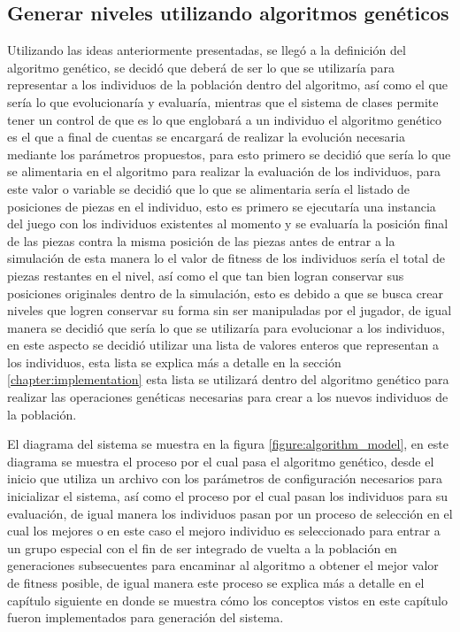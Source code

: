 \subsection{Generar niveles utilizando algoritmos genéticos}
\label{subsection:generate-levels-using-GA}

Utilizando las ideas anteriormente presentadas, se llegó a la definición del
algoritmo genético, se decidó que deberá de ser lo que se utilizaría para
representar a los individuos de la población dentro del algoritmo, así como el
que sería lo que evolucionaría y evaluaría, mientras que el sistema de clases
permite tener un control de que es lo que englobará a un individuo el algoritmo
genético es el que a final de cuentas se encargará de realizar la evolución
necesaria mediante los parámetros propuestos, para esto primero se decidió que
sería lo que se alimentaria en el algoritmo para realizar la evaluación de los
individuos, para este valor o variable se decidió que lo que se alimentaria
sería el listado de posiciones de piezas en el individuo, esto es primero se
ejecutaría una instancia del juego con los individuos existentes al momento y se
evaluaría la posición final de las piezas contra la misma posición de las piezas
antes de entrar a la simulación de esta manera lo el valor de fitness de los
individuos sería el total de piezas restantes en el nivel, así como el que tan
bien logran conservar sus posiciones originales dentro de la simulación, esto es
debido a que se busca crear niveles que logren conservar su forma sin ser
manipuladas por el jugador, de igual manera se decidió que sería lo que se
utilizaría para evolucionar a los individuos, en este aspecto se decidió
utilizar una lista de valores enteros que representan a los individuos, esta
lista se explica más a detalle en la sección \ref{chapter:implementation} esta
lista se utilizará dentro del algoritmo genético para realizar las operaciones
genéticas necesarias para crear a los nuevos individuos de la población. 

El diagrama del sistema se muestra en la figura \ref{figure:algorithm_model}, en
este diagrama se muestra el proceso por el cual pasa el algoritmo genético, desde
el inicio que utiliza un archivo con los parámetros de configuración necesarios
para inicializar el sistema, así como el proceso por el cual pasan los
individuos para su evaluación, de igual manera los individuos pasan por un
proceso de selección en el cual los mejores o en este caso el mejoro individuo
es seleccionado para entrar a un grupo especial con el fin de ser integrado de
vuelta a la población en generaciones subsecuentes para encaminar al algoritmo a
obtener el mejor valor de fitness posible, de igual manera este proceso se
explica más a detalle en el capítulo siguiente en donde se muestra cómo los
conceptos vistos en este capítulo fueron implementados para generación del
sistema.

